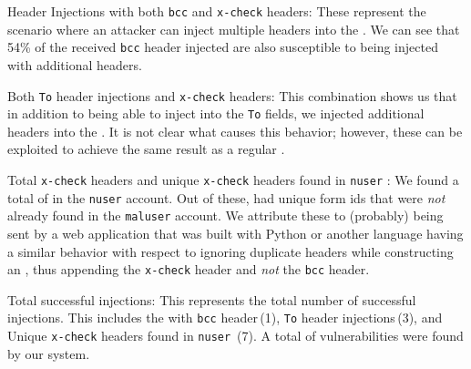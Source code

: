 

\Email Header Injections with both \texttt{bcc} and \texttt{x-check}
headers: These represent the scenario where an attacker can inject
multiple headers into the \emails. We can see that 54\% of the
received \texttt{bcc} header injected \emails are also susceptible to
being injected with additional headers.
	
Both \texttt{To} header injections and \texttt{x-check} headers: This
combination shows us that in addition to being able to inject into the
\texttt{To} fields, we injected additional headers into the \email. It
is not clear what causes this behavior; however, these can be
exploited to achieve the same result as a regular \ehi.
	
Total \texttt{x-check} headers and unique \texttt{x-check} headers
found in \texttt{nuser} \emails: We found a total of \ehinuserxcheck
\emails in the \texttt{nuser} account. Out of these,
\ehiuniquenuserxcheck had unique form ids that were \emph{not} already
found in the \texttt{maluser} account. We attribute these \emails to
(probably) being sent by a web application that was built with Python
or another language having a similar behavior with respect to ignoring
duplicate headers while constructing an \email, thus appending the
\texttt{x-check} header and \emph{not} the \texttt{bcc} header.
	
Total successful injections: This represents the total number of
successful injections. This includes the \ehi with \texttt{bcc}
header\,(1), \texttt{To} header injections\,(3), and Unique
\texttt{x-check} headers found in \texttt{nuser} \emails\,(7). A total
of \success vulnerabilities were found by our system.

